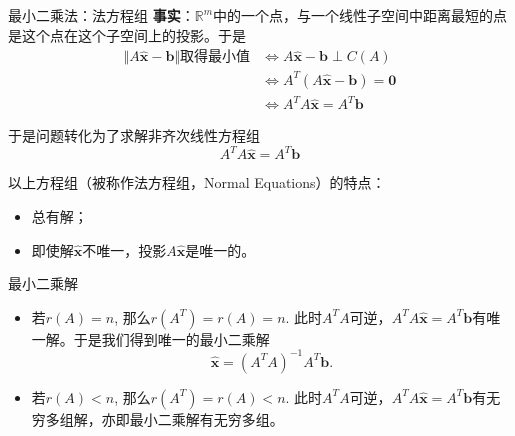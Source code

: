 
\begin{frame}

\begin{block}{最小二乘法：法方程组}
{\bfseries 事实}：$\mathbb{R}^m$中的一个点，与一个线性子空间中距离最短的点是这个点在这个子空间上的投影。于是
\begin{align*}
\Vert A\widehat{\mathbf{x}} - \mathbf{b} \Vert \text{取得最小值} & \Longleftrightarrow A\widehat{\mathbf{x}} - \mathbf{b} \perp C(A) \\
& \Longleftrightarrow A^T (A\widehat{\mathbf{x}} - \mathbf{b}) = \mathbf{0} \\
& \Longleftrightarrow A^TA\widehat{\mathbf{x}} = A^T\mathbf{b}
\end{align*}

于是问题转化为了求解非齐次线性方程组
$$A^TA\widehat{\mathbf{x}} = A^T\mathbf{b}$$

\vspace{1em}
\pause

以上方程组（被称作法方程组，Normal Equations）的特点：
\begin{itemize}
\item 总有解；
\item 即使解$\widehat{\mathbf{x}}$不唯一，投影$A\widehat{\mathbf{x}}$是唯一的。
\end{itemize}
\end{block}

\end{frame}


\begin{frame}

\begin{block}{最小二乘解}
\begin{itemize}
\item<1-> 若$r(A) = n$, 那么$r(A^T) = r(A) = n$. 此时$A^TA$可逆，$A^TA\widehat{\mathbf{x}} = A^T\mathbf{b}$有唯一解。于是我们得到唯一的最小二乘解
$$\widehat{\mathbf{x}} = (A^TA)^{-1}A^T\mathbf{b}.$$
\item<2-> 若$r(A) < n$, 那么$r(A^T) = r(A) < n$. 此时$A^TA$可逆，$A^TA\widehat{\mathbf{x}} = A^T\mathbf{b}$有无穷多组解，亦即最小二乘解有无穷多组。
\end{itemize}
\end{block}

\end{frame}


